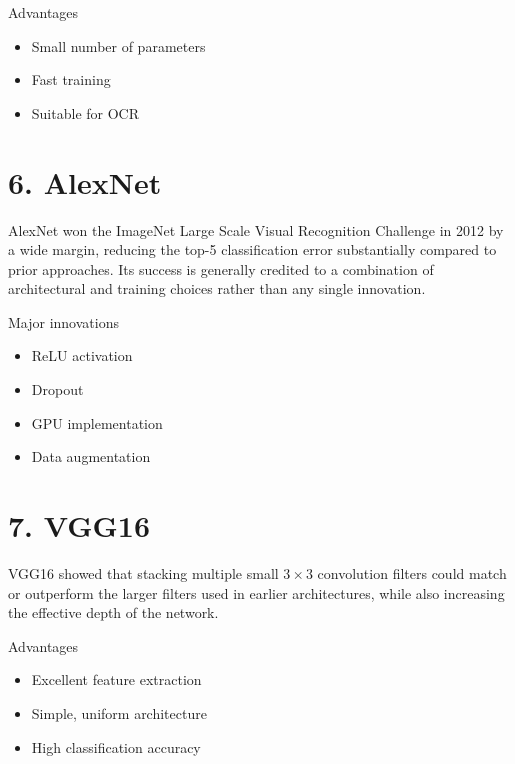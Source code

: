 \documentclass[11pt]{article}
\begin{document}
Advantages

\begin{itemize}
\item Small number of parameters
\item Fast training
\item Suitable for OCR
\end{itemize}


\section*{6. AlexNet}

AlexNet won the ImageNet Large Scale Visual Recognition Challenge in 2012 by
a wide margin, reducing the top-5 classification error substantially compared
to prior approaches. Its success is generally credited to a combination of
architectural and training choices rather than any single innovation.

Major innovations

\begin{itemize}
\item ReLU activation
\item Dropout
\item GPU implementation
\item Data augmentation
\end{itemize}


\section*{7. VGG16}

VGG16 showed that stacking multiple small $3\times3$ convolution filters
could match or outperform the larger filters used in earlier architectures,
while also increasing the effective depth of the network.

Advantages

\begin{itemize}
\item Excellent feature extraction
\item Simple, uniform architecture
\item High classification accuracy
\end{itemize}

\end{document}
